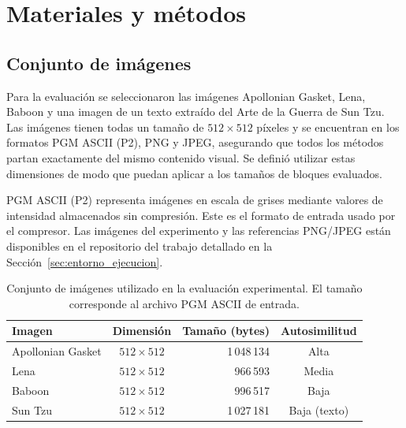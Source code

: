 
\section{Materiales y métodos}

\subsection{Conjunto de imágenes}

Para la evaluación se seleccionaron las imágenes Apollonian Gasket, Lena, Baboon y una imagen de un texto extraído del Arte de la Guerra de Sun Tzu. Las imágenes tienen todas un tamaño de $512\times512$ píxeles y se encuentran en los formatos PGM ASCII (P2)\cite{netpbmPGM}, PNG y JPEG, asegurando que todos los métodos partan exactamente del mismo contenido visual. Se definió utilizar estas dimensiones de modo que puedan aplicar a los tamaños de bloques evaluados.

PGM ASCII (P2) representa imágenes en escala de grises mediante valores de intensidad almacenados sin compresión. Este es el formato de entrada usado por el compresor. Las imágenes del experimento y las referencias PNG/JPEG están disponibles en el repositorio del trabajo detallado en la Sección~\ref{sec:entorno_ejecucion}.

\begin{table}[htbp]
\centering
\caption{Conjunto de imágenes utilizado en la evaluación experimental. El tamaño corresponde al archivo PGM ASCII de entrada.}
\label{tab:conjunto_imagenes}
\begin{tabular}{lcrc}
\toprule
Imagen & Dimensión & Tamaño (bytes) & Autosimilitud \\
\midrule
Apollonian Gasket & $512\times512$ & 1\,048\,134 & Alta \\
Lena & $512\times512$ & 966\,593 & Media \\
Baboon & $512\times512$ & 996\,517 & Baja \\
Sun Tzu & $512\times512$ & 1\,027\,181 & Baja (texto) \\
\bottomrule
\end{tabular}
\end{table}


